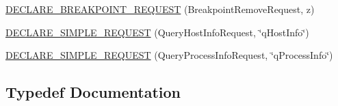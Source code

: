 \begin{DoxyCompactItemize}
\item 
\mbox{\hyperlink{namespacexd_1_1dbg_1_1gdbstub_1_1pkt_a2beb6edd494b1ed8e5fdfdfc2a5019ef}{D\+E\+C\+L\+A\+R\+E\+\_\+\+B\+R\+E\+A\+K\+P\+O\+I\+N\+T\+\_\+\+R\+E\+Q\+U\+E\+ST}} (Breakpoint\+Remove\+Request, \textquotesingle{}z\textquotesingle{})
\item 
\mbox{\hyperlink{namespacexd_1_1dbg_1_1gdbstub_1_1pkt_a35ca67f7ed5fadb44bcf6d3b8e64c0d2}{D\+E\+C\+L\+A\+R\+E\+\_\+\+S\+I\+M\+P\+L\+E\+\_\+\+R\+E\+Q\+U\+E\+ST}} (Query\+Host\+Info\+Request, \char`\"{}q\+Host\+Info\char`\"{})
\item 
\mbox{\hyperlink{namespacexd_1_1dbg_1_1gdbstub_1_1pkt_a9c1c2f08b963f68552f33d8a8f2e33d2}{D\+E\+C\+L\+A\+R\+E\+\_\+\+S\+I\+M\+P\+L\+E\+\_\+\+R\+E\+Q\+U\+E\+ST}} (Query\+Process\+Info\+Request, \char`\"{}q\+Process\+Info\char`\"{})
\end{DoxyCompactItemize}


\subsection{Typedef Documentation}
\mbox{\label{namespacexd_1_1dbg_1_1gdbstub_1_1pkt_a65690974f9b6e8807842c637042664a6}} 
